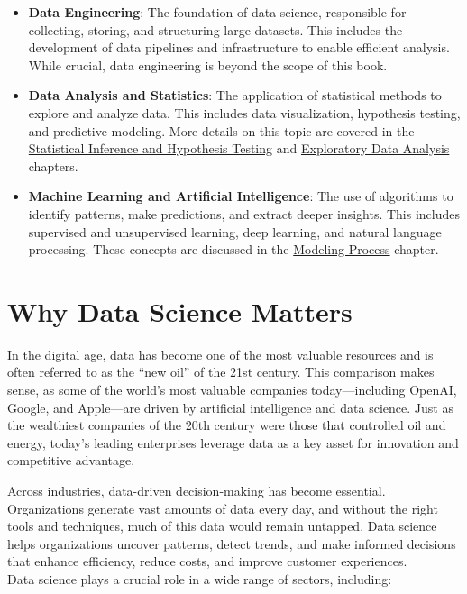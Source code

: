 \documentclass[
]{book}
\providecommand{\tightlist}{%
  \setlength{\itemsep}{0pt}\setlength{\parskip}{0pt}}
\theoremstyle{definition}
\theoremstyle{definition}
\theoremstyle{definition}
\theoremstyle{definition}
\theoremstyle{remark}
\begin{document}
\begin{itemize}
\tightlist
\item
  \textbf{Data Engineering}: The foundation of data science, responsible for collecting, storing, and structuring large datasets. This includes the development of data pipelines and infrastructure to enable efficient analysis. While crucial, data engineering is beyond the scope of this book.\\
\item
  \textbf{Data Analysis and Statistics}: The application of statistical methods to explore and analyze data. This includes data visualization, hypothesis testing, and predictive modeling. More details on this topic are covered in the \hyperref[chapter-statistics]{Statistical Inference and Hypothesis Testing} and \hyperref[chapter-EDA]{Exploratory Data Analysis} chapters.\\
\item
  \textbf{Machine Learning and Artificial Intelligence}: The use of algorithms to identify patterns, make predictions, and extract deeper insights. This includes supervised and unsupervised learning, deep learning, and natural language processing. These concepts are discussed in the \hyperref[chapter-modeling]{Modeling Process} chapter.
\end{itemize}

\section{Why Data Science Matters}\label{why-data-science-matters}

In the digital age, data has become one of the most valuable resources and is often referred to as the ``new oil'' of the 21st century. This comparison makes sense, as some of the world's most valuable companies today---including OpenAI, Google, and Apple---are driven by artificial intelligence and data science. Just as the wealthiest companies of the 20th century were those that controlled oil and energy, today's leading enterprises leverage data as a key asset for innovation and competitive advantage.

Across industries, data-driven decision-making has become essential. Organizations generate vast amounts of data every day, and without the right tools and techniques, much of this data would remain untapped. Data science helps organizations uncover patterns, detect trends, and make informed decisions that enhance efficiency, reduce costs, and improve customer experiences.\\
Data science plays a crucial role in a wide range of sectors, including:
\end{document}

